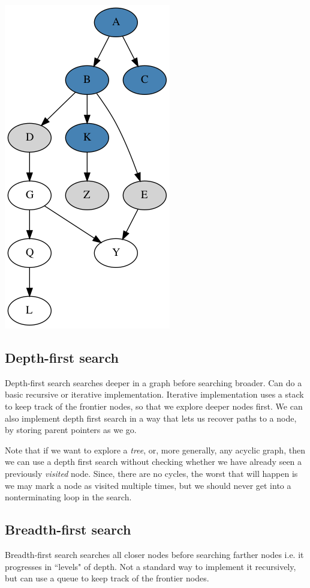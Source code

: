 \documentclass[10pt,a4paper]{article}
\begin{document}
\begin{center}
    \includegraphics[scale=0.25]{diagrams/g4.png}
\end{center}

\subsection{Depth-first search}
Depth-first search searches deeper in a graph before searching broader. Can do a basic recursive or iterative implementation. Iterative implementation uses a stack to keep track of the frontier nodes, so that we explore deeper nodes first. We can also implement depth first search in a way that lets us recover paths to a node, by storing parent pointers as we go.

Note that if we want to explore a \textit{tree}, or, more generally, any acyclic graph, then we can use a depth first search without checking whether we have already seen a previously \textit{visited} node. Since, there are no cycles, the worst that will happen is we may mark a node as visited multiple times, but we should never get into a nonterminating loop in the search.

\subsection{Breadth-first search}
Breadth-first search searches all closer nodes before searching farther nodes i.e. it progresses in ``levels" of depth. Not a standard way to implement it recursively, but can use a queue to keep track of the frontier nodes.
\end{document}
